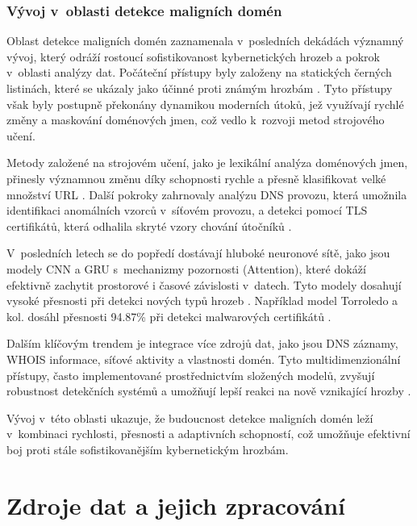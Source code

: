 \subsection{Vývoj v~oblasti detekce maligních domén}

Oblast detekce maligních domén zaznamenala v~posledních dekádách významný vývoj, který odráží rostoucí sofistikovanost kybernetických hrozeb a pokrok v~oblasti analýzy dat. Počáteční přístupy byly založeny na statických černých listinách, které se ukázaly jako účinné proti známým hrozbám \cite{provos2007virtual, moore-clayton}. Tyto přístupy však byly postupně překonány dynamikou moderních útoků, jež využívají rychlé změny a maskování doménových jmen, což vedlo k~rozvoji metod strojového učení.

Metody založené na strojovém učení, jako je lexikální analýza doménových jmen, přinesly významnou změnu díky schopnosti rychle a přesně klasifikovat velké množství URL \cite{ma2011learning, perdisci2012url}. Další pokroky zahrnovaly analýzu DNS provozu, která umožnila identifikaci anomálních vzorců v~síťovém provozu, a detekci pomocí TLS certifikátů, která odhalila skryté vzory chování útočníků \cite{dns_query_analysis_ml, torroledo2018hunting}.

V~posledních letech se do popředí dostávají hluboké neuronové sítě, jako jsou modely CNN a GRU s~mechanizmy pozornosti (Attention), které dokáží efektivně zachytit prostorové i časové závislosti v~datech. Tyto modely dosahují vysoké přesnosti při detekci nových typů hrozeb \cite{cnn_gru_attention}. Například model Torroledo a kol. dosáhl přesnosti 94.87\% při detekci malwarových certifikátů \cite{torroledo2018hunting}.

Dalším klíčovým trendem je integrace více zdrojů dat, jako jsou DNS záznamy, WHOIS informace, síťové aktivity a vlastnosti domén. Tyto multidimenzionální přístupy, často implementované prostřednictvím složených modelů, zvyšují robustnost detekčních systémů a umožňují lepší reakci na nově vznikající hrozby \cite{bilge2011exposure, abuNimeh2007comparison}.

Vývoj v~této oblasti ukazuje, že budoucnost detekce maligních domén leží v~kombinaci rychlosti, přesnosti a adaptivních schopností, což umožňuje efektivní boj proti stále sofistikovanějším kybernetickým hrozbám.





\chapter{Zdroje dat a jejich zpracování}
\label{chapter:3}

